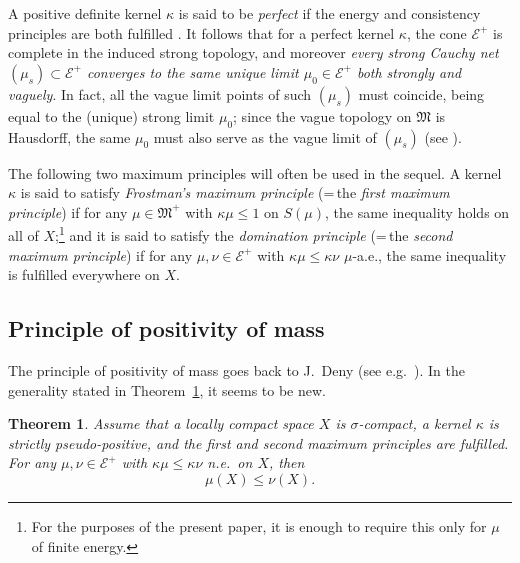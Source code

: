 \documentclass[12pt,a4paper,reqno]{amsart} %
\theoremstyle{lause}
\theoremstyle{maaritelma}
\theoremstyle{lause}
\newtheorem{theorem}{Theorem}[section]
\theoremstyle{maaritelma}
\numberwithin{equation}{section}
\begin{document}
A positive definite kernel $\kappa$ is said to be {\it perfect\/} if the energy and consistency principles are both fulfilled \cite[Section~3.3]{F1}. It follows that for a perfect kernel $\kappa$, the cone $\mathcal E^+$ is  complete in the induced strong topology, and moreover {\it every strong Cauchy net\/ $(\mu_s)\subset\mathcal E^+$ converges to the same unique limit\/ $\mu_0\in\mathcal E^+$ both strongly and vaguely}. In fact, all the vague limit points of such $(\mu_s)$ must coincide, being equal to the (unique) strong limit $\mu_0$; since the vague topology on $\mathfrak M$ is Hausdorff, the same $\mu_0$ must also serve as the vague limit of $(\mu_s)$ (see \cite[Section~I.9.1, Corollary]{B1}).

The following two maximum principles will often be used in the sequel.
A kernel $\kappa$ is said to satisfy {\it Frostman's maximum principle\/} ({}=\,the {\it first maximum principle\/}) if for any $\mu\in\mathfrak M^+$ with $\kappa\mu\leqslant1$ on $S(\mu)$, the same inequality holds on all of $X$;\footnote{For the purposes of the present paper, it is enough to
require this only for $\mu$ of finite energy.}
and it is said to satisfy the {\it domination principle\/} ({}=\,the {\it second maximum principle\/}) if for any $\mu,\nu\in\mathcal E^+$ with $\kappa\mu\leqslant\kappa\nu$ $\mu$-a.e., the same inequality is fulfilled everywhere on $X$.

\subsection{Principle of positivity of mass}\label{sec-pr-pos}
The principle of positivity of mass goes back to J.~Deny (see e.g.\ \cite{D2}). In the generality stated in Theorem~\ref{pr-pos}, it seems to be new.

\begin{theorem}\label{pr-pos} Assume that a locally compact space\/ $X$ is\/ $\sigma$-compact, a kernel\/ $\kappa$ is strictly pseudo-positive, and the first and second maximum principles are fulfilled.
For any\/ $\mu,\nu\in\mathcal E^+$ with\/
$\kappa\mu\leqslant\kappa\nu$ n.e.\ on\/ $X$, then
\begin{equation}\label{prpos}\mu(X)\leqslant\nu(X).\end{equation}
\end{theorem}
\end{document}
